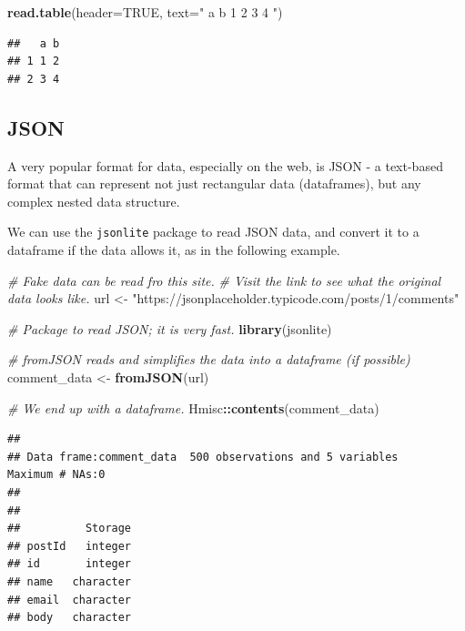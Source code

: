 \documentclass[]{book}
\newenvironment{Shaded}{\begin{snugshade}}{\end{snugshade}}
\newcommand{\CommentTok}[1]{\textcolor[rgb]{0.56,0.35,0.01}{\textit{#1}}}
\newcommand{\DataTypeTok}[1]{\textcolor[rgb]{0.13,0.29,0.53}{#1}}
\newcommand{\KeywordTok}[1]{\textcolor[rgb]{0.13,0.29,0.53}{\textbf{#1}}}
\newcommand{\NormalTok}[1]{#1}
\newcommand{\OperatorTok}[1]{\textcolor[rgb]{0.81,0.36,0.00}{\textbf{#1}}}
\newcommand{\OtherTok}[1]{\textcolor[rgb]{0.56,0.35,0.01}{#1}}
\newcommand{\StringTok}[1]{\textcolor[rgb]{0.31,0.60,0.02}{#1}}
\begin{document}
\begin{Shaded}
\begin{Highlighting}[]
\KeywordTok{read.table}\NormalTok{(}\DataTypeTok{header=}\OtherTok{TRUE}\NormalTok{, }\DataTypeTok{text=}\StringTok{"}
\StringTok{a b}
\StringTok{1 2}
\StringTok{3 4}
\StringTok{"}\NormalTok{)}
\end{Highlighting}
\end{Shaded}

\begin{verbatim}
##   a b
## 1 1 2
## 2 3 4
\end{verbatim}

\hypertarget{json}{%
\subsection{JSON}\label{json}}

A very popular format for data, especially on the web, is JSON - a text-based format that can represent not just rectangular data (dataframes), but any complex nested data structure.

We can use the \texttt{jsonlite} package to read JSON data, and convert it to a dataframe if the data allows it, as in the following example.

\begin{Shaded}
\begin{Highlighting}[]
\CommentTok{# Fake data can be read fro this site.}
\CommentTok{# Visit the link to see what the original data looks like.}
\NormalTok{url <-}\StringTok{ "https://jsonplaceholder.typicode.com/posts/1/comments"}

\CommentTok{# Package to read JSON; it is very fast.}
\KeywordTok{library}\NormalTok{(jsonlite)}

\CommentTok{# fromJSON reads and simplifies the data into a dataframe (if possible)}
\NormalTok{comment_data <-}\StringTok{ }\KeywordTok{fromJSON}\NormalTok{(url)}

\CommentTok{# We end up with a dataframe.}
\NormalTok{Hmisc}\OperatorTok{::}\KeywordTok{contents}\NormalTok{(comment_data)}
\end{Highlighting}
\end{Shaded}

\begin{verbatim}
## 
## Data frame:comment_data  500 observations and 5 variables    Maximum # NAs:0
## 
## 
##          Storage
## postId   integer
## id       integer
## name   character
## email  character
## body   character
\end{verbatim}
\end{document}
